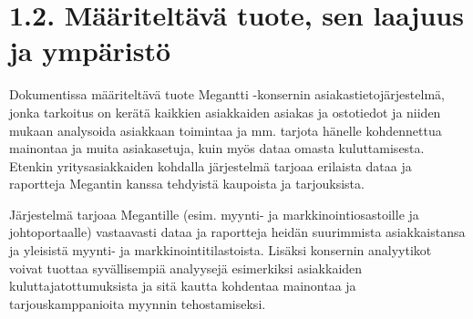 \section{1.2. Määriteltävä tuote, sen laajuus ja ympäristö}
\begin{1.2}

    Dokumentissa määriteltävä tuote Megantti -konsernin asiakastietojärjestelmä, jonka tarkoitus on kerätä kaikkien asiakkaiden asiakas
    ja ostotiedot ja niiden mukaan analysoida asiakkaan toimintaa ja mm. tarjota hänelle kohdennettua mainontaa ja muita asiakasetuja, 
    kuin myös dataa omasta kuluttamisesta. Etenkin yritysasiakkaiden kohdalla järjestelmä tarjoaa erilaista dataa ja raportteja Megantin 
    kanssa tehdyistä kaupoista ja tarjouksista. 
    
    Järjestelmä tarjoaa Megantille (esim. myynti- ja markkinointiosastoille ja johtoportaalle) vastaavasti dataa ja raportteja heidän 
    suurimmista asiakkaistansa ja yleisistä myynti- ja markkinointitilastoista. Lisäksi konsernin analyytikot voivat tuottaa syvällisempiä 
    analyysejä esimerkiksi asiakkaiden kuluttajatottumuksista ja sitä kautta kohdentaa mainontaa ja tarjouskamppanioita myynnin tehostamiseksi.
    

\end{1.2}
